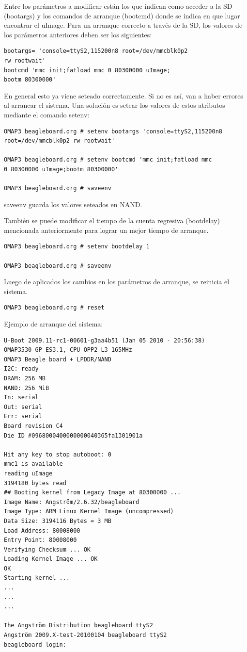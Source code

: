 Entre los parámetros a modificar están los que indican como acceder a la SD (bootargs) y los comandos de arranque (bootcmd) donde se indica en que lugar encontrar el uImage. Para un arranque correcto a través de la SD, los valores de los parámetros anteriores deben ser los siguientes:

\begin{verbatim}
bootargs= 'console=ttyS2,115200n8 root=/dev/mmcblk0p2 
rw rootwait' 
bootcmd 'mmc init;fatload mmc 0 80300000 uImage;
bootm 80300000' 
\end{verbatim}

En general esto ya viene seteado correctamente. Si no es así, van a haber errores al arrancar el sistema. Una solución es setear los valores de estos atributos mediante el comando setenv:

\begin{verbatim}
OMAP3 beagleboard.org # setenv bootargs 'console=ttyS2,115200n8 
root=/dev/mmcblk0p2 rw rootwait' 

OMAP3 beagleboard.org # setenv bootcmd 'mmc init;fatload mmc 
0 80300000 uImage;bootm 80300000' 

OMAP3 beagleboard.org # saveenv 
\end{verbatim}

saveenv guarda los valores seteados en NAND.

\bigskip
También se puede modificar el tiempo de la cuenta regresiva (bootdelay) mencionada anteriormente para lograr un mejor tiempo de arranque.

\begin{verbatim}
OMAP3 beagleboard.org # setenv bootdelay 1

OMAP3 beagleboard.org # saveenv 
\end{verbatim}

Luego de aplicados los cambios en los parámetros de arranque, se reinicia el sistema.

\begin{verbatim}
OMAP3 beagleboard.org # reset 
\end{verbatim}

Ejemplo de arranque del sistema:

\begin{verbatim}
U-Boot 2009.11-rc1-00601-g3aa4b51 (Jan 05 2010 - 20:56:38) 
OMAP3530-GP ES3.1, CPU-OPP2 L3-165MHz 
OMAP3 Beagle board + LPDDR/NAND 
I2C: ready 
DRAM: 256 MB 
NAND: 256 MiB 
In: serial 
Out: serial 
Err: serial 
Board revision C4 
Die ID #0968000400000000040365fa1301901a 

Hit any key to stop autoboot: 0 
mmc1 is available 
reading uImage 
3194180 bytes read 
## Booting kernel from Legacy Image at 80300000 ... 
Image Name: Angström/2.6.32/beagleboard 
Image Type: ARM Linux Kernel Image (uncompressed) 
Data Size: 3194116 Bytes = 3 MB 
Load Address: 80008000 
Entry Point: 80008000 
Verifying Checksum ... OK 
Loading Kernel Image ... OK 
OK 
Starting kernel ... 
... 
... 
... 

The Angström Distribution beagleboard ttyS2 
Angström 2009.X-test-20100104 beagleboard ttyS2 
beagleboard login: 
\end{verbatim}

